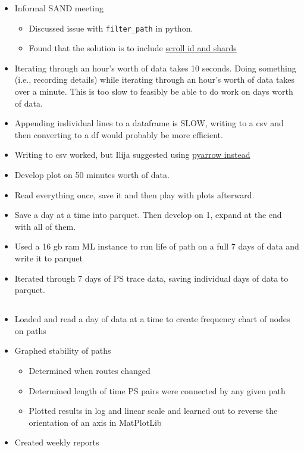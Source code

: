 \documentclass{weeklyreport}
\begin{document}
\begin{itemize}
	\item Informal SAND meeting
	\begin{itemize}
		\item Discussed issue with \texttt{filter\_path} in python.
		\item Found that the solution is to include \href{https://stackoverflow.com/questions/41054121/usage-of-filter-path-with-helpers-scan-in-elastisearch-client}{scroll id and shards}
	\end{itemize}
	\item Iterating through an hour's worth of data takes 10 seconds. Doing something (i.e., recording details) while iterating through an hour's worth of data takes over a minute. This is too slow to feasibly be able to do work on days worth of data.
	\item Appending individual lines to a dataframe is SLOW, writing to a csv and then converting to a df would probably be more efficient.
	\item Writing to csv worked, but Ilija suggested using \href{https://arrow.apache.org/docs/python/parquet.html?highlight=pyarrow%5C%20parquet%5C%20partition}{pyarrow instead}
	\item Develop plot on 50 minutes worth of data.
	\item Read everything once, save it and then play with plots afterward.
	\item Save a day at a time into parquet. Then develop on 1, expand at the end with all of them.
	\item Used a 16 gb ram ML instance to run life of path on a full 7 days of data and write it to parquet
	\item Iterated through 7 days of PS trace data, saving individual days of data to parquet.
\end{itemize}


\subsection*{}

\begin{itemize}
	\item Loaded and read a day of data at a time to create frequency chart of nodes on paths
	\item Graphed stability of paths
	\begin{itemize}
		\item Determined when routes changed
		\item Determined length of time PS pairs were connected by any given path
		\item Plotted results in log and linear scale and learned out to reverse the orientation of an axis in MatPlotLib
	\end{itemize}
	\item Created weekly reports
\end{itemize}
\end{document}
